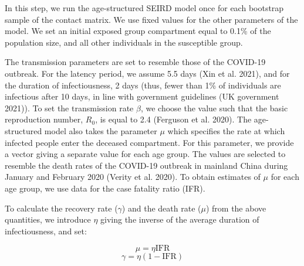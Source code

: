 \documentclass[
]{article}
\begin{document}
In this step, we run the age-structured SEIRD model once for each
bootstrap sample of the contact matrix. We use fixed values for the
other parameters of the model. We set an initial exposed group
compartment equal to 0.1\% of the population size, and all other
individuals in the susceptible group.

The transmission parameters are set to resemble those of the COVID-19
outbreak. For the latency period, we assume 5.5 days (Xin et al. 2021),
and for the duration of infectiousness, 2 days (thus, fewer than 1\% of
individuals are infectious after 10 days, in line with government
guidelines (UK government 2021)). To set the transmission rate
\(\beta\), we choose the value such that the basic reproduction number,
\(R_0\), is equal to 2.4 (Ferguson et al. 2020). The age-structured
model also takes the parameter \(\mu\) which specifies the rate at which
infected people enter the deceased compartment. For this parameter, we
provide a vector giving a separate value for each age group. The values
are selected to resemble the death rates of the COVID-19 outbreak in
mainland China during January and February 2020 (Verity et al. 2020). To
obtain estimates of \(\mu\) for each age group, we use data for the case
fatality ratio (IFR).

To calculate the recovery rate (\(\gamma\)) and the death rate (\(\mu\))
from the above quantities, we introduce \(\eta\) giving the inverse of
the average duration of infectiousness, and set:

\[\mu = \eta \text{IFR}\] \[\gamma = \eta (1-\text{IFR})\]
\end{document}

